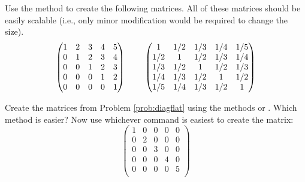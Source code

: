 \begin{problem}
Use the  method to create the following matrices. 
All of these matrices should be easily scalable (i.e., only minor modification would be required to change the size).
\begin{equation*}
\begin{pmatrix}
1&2&3&4&5\\
0&1&2&3&4\\
0&0&1&2&3 \\
0&0&0&1&2 \\
0&0&0&0&1 \\
\end{pmatrix}
\hspace{8mm}
\begin{pmatrix}
1&1/2&1/3 & 1/4 &1/5\\
1/2&1&1/2&1/3&1/4\\
1/3&1/2&1&1/2&1/3 \\
1/4&1/3&1/2&1&1/2 \\
1/5&1/4&1/3&1/2&1 \\
\end{pmatrix}
\end{equation*}
\label{prob:diagflat}
\end{problem}

\begin{problem}
Create the matrices from Problem \ref{prob:diagflat} using the methods 
 or . 
Which method is easier? Now use whichever command is easiest to create the matrix:
\begin{equation*}
\begin{pmatrix}
1&0&0&0&0\\
0&2&0&0&0\\
0&0&3&0&0 \\
0&0&0&4&0 \\
0&0&0&0&5 \\
\end{pmatrix}
\end{equation*}
\end{problem}
 

